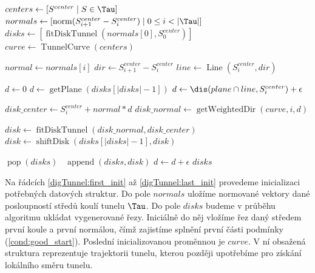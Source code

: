 \begin{algorithmic}[1]
\label{alg:digTunnel}

    \State $ centers \gets [ S^{center} \mid S \in \Tau ] $ \label{digTunnel:first_init}
    \State $ normals \gets [ \operatorname{norm}(S_{i + 1}^{center} - S_{i}^{center}) \mid 0 \leq i < |\Tau| ] $
    \State $ disks \gets   [ \operatorname{fitDiskTunnel}(normals[0], S_0^{center})] $
    \State $ curve \gets \operatorname{TunnelCurve}(centers) $ \label{digTunnel:last_init}
    \Statex

            \Break
        \EndIf
        \State $ normal \gets normals[i] $
        \State $ dir \gets S_{i + 1}^{center} - S_{i}^{center} $
        \State $ line \gets \operatorname{Line}(S_{i}^{center}, dir) $
        \Statex

        \State $ d \gets 0 $
         \label{digTunnel:while}
            \State $ d \gets \operatorname{getPlane}(disks[|disks|-1]) $
            \State $ d \gets \dis(plane \cap line, S_{i}^{center}) + \epsilon $
            \Statex

            \State $ disk\_center \gets S_{i}^{center} + normal * d $ \label{digTunnel:center}
            \State $ disk\_normal \gets \operatorname{getWeightedDir}(curve, i, d) $ \label{digTunnel:normal}

            \State $ disk \gets \operatorname{fitDiskTunnel}(disk\_normal, disk\_center) $ \label{alg:fit_disk}
            \State $ disk \gets \operatorname{shiftDisk}(disks[|disks|-1], disk) $ \label{alg:shift_disk}
            \Statex

             \label{digTunnel:last_if}
                \State $ \operatorname{pop}(disks)  $ \label{digTunnel:last_if_end}
            \EndIf\
            \State $ \operatorname{append}(disks, disk) $
            \State $ d \gets d + \epsilon $ \label{digTunnel:incr_d}
        \EndWhile
    \EndFor
    \State \Return $ disks $
\EndFunction

\end{algorithmic}

Na řádcích \ref{digTunnel:first_init} až \ref{digTunnel:last_init} provedeme
inicializaci potřebných datových struktur. Do pole $ normals $ uložíme normované
vektory dané posloupností středů koulí tunelu $ \Tau $. Do pole $ disks $ budeme
v průběhu algoritmu ukládat vygenerované řezy. Iniciálně do něj vložíme
řez daný středem první koule a první normálou, čímž zajistíme splnění první
části podmínky (\ref{cond:good_start}). Poslední inicializovanou proměnnou je
$ curve $. V ní obsažená struktura reprezentuje trajektorii tunelu, kterou později
upotřebíme pro získání lokálního směru tunelu.

